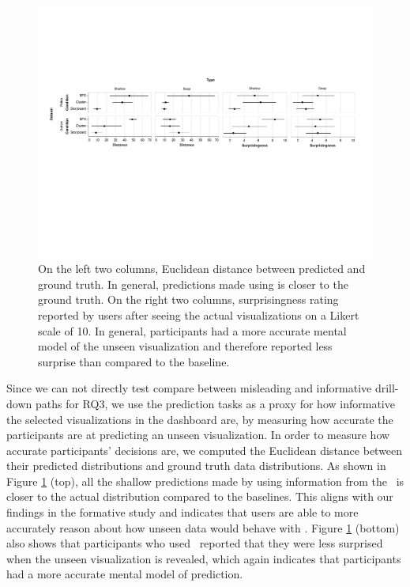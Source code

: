 \begin{figure}[h!]
\centering
\includegraphics[width=\linewidth]{figures/prediction_results.pdf}
\caption{On the left two columns, Euclidean distance between predicted and ground truth. In general, predictions made using \system is closer to the ground truth. On the right two columns, surprisingness rating reported by users after seeing the actual visualizations on a Likert scale of 10. In general, \system participants had a more accurate mental model of the unseen visualization and therefore reported less surprise than compared to the baseline.}
\label{fig:distance}
\end{figure}
 Since we can not directly test compare between misleading and informative drill-down paths for RQ3, we use the prediction tasks as a proxy for how informative the selected visualizations in the dashboard are, by measuring how accurate the participants are at predicting an unseen visualization. In order to measure how accurate participants' decisions are, we computed the Euclidean distance between their predicted distributions and ground truth data distributions. As shown in Figure \ref{fig:distance} (top), all the shallow predictions made by using information from the \system\ is closer to the actual distribution compared to the baselines. This aligns with our findings in the formative study and indicates that users are able to more accurately reason about how unseen data would behave with \system. Figure \ref{fig:distance} (bottom) also shows that participants who used \system\ reported that they were less surprised when the unseen visualization is revealed, which again indicates that participants had a more accurate mental model of prediction.
